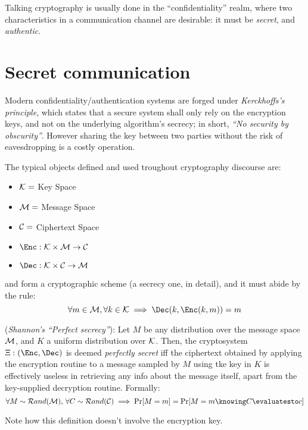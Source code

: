
Talking cryptography is usually done in the ``confidentiality'' realm, where two characteristics in a communication channel are desirable: it must be \emph{secret}, and \emph{authentic}.

\section{Secret communication}


Modern confidentiality/authentication systems are forged under \emph{Kerckhoffs's principle}, which states that a secure system shall only rely on the encryption keys, and not on the underlying algorithm's secrecy; in short, \emph{``No security by obscurity''}. However sharing the key between two parties without the risk of eavesdropping is a costly operation.

The typical objects defined and used troughout cryptography discourse are:
\begin{itemize}
    \item $\mathcal{K} = $ Key Space
    \item $\mathcal{M} = $ Message Space
    \item $\mathcal{C} = $ Ciphertext Space
    \item $\Enc: \K \times \M \to \C$
    \item $\Dec: \K \times \C \to \M$
\end{itemize}

\Enc and \Dec form a cryptographic scheme (a secrecy one, in detail), and it must abide by the rule:
\[
    \forall m \in \M, \forall k \in \K \implies \Dec(k, \Enc(k, m)) = m
\]

\begin{definition}
    (\textit{Shannon's ``Perfect secrecy''}): Let $M$ be any distribution over the message space $\mathcal{M}$, and $K$ a uniform distribution over $\mathcal{K}$. Then, the cryptosystem $\Xi: (\Enc, \Dec)$ is deemed \emph{perfectly secret} iff the ciphertext obtained by applying the encryption routine to a message sampled by $M$ using tke key in $K$ is effectively useless in retrieving any info about the message itself, apart from the key-supplied decryption routine. Formally:
    \[
        \forall M \sim \mathcal{R}and(\M),\, \forall C \sim \mathcal{R}and(\C) \implies \Pr[M = m] = \Pr[M = m \knowing C \evaluatesto c]
    \]
\end{definition}
Note how this definition doesn't involve the encryption key. %

